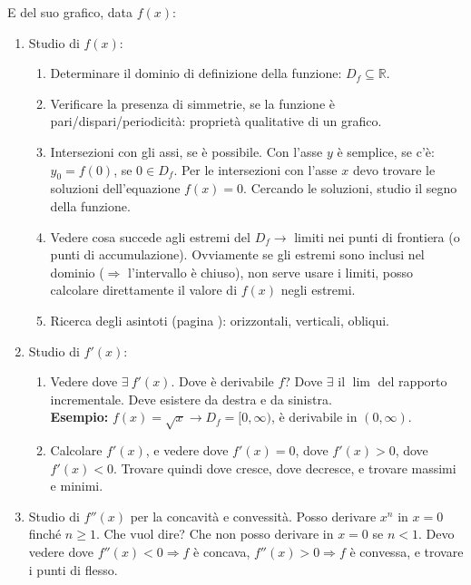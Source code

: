 \documentclass[12pt,a4paper]{article}
\begin{document}
E del suo grafico, data $f(x)$:
\begin{enumerate}
\item   Studio di $f(x)$:
    \begin{enumerate}
    \item   Determinare il dominio di definizione della funzione: 
            $D_f \subseteq \mathbb{R}$.
    \item   Verificare la presenza di simmetrie, se la funzione \`e 
            pari/dispari/periodicit\`a: propriet\`a qualitative di un grafico.
    \item   Intersezioni con gli assi, se \`e possibile. Con l'asse $y$ \`e
            semplice, se c'\`e: $y_0 = f(0)$, se $0 \in D_f$. Per le intersezioni
            con l'asse $x$ devo trovare le soluzioni dell'equazione $f(x) = 0$.
            Cercando le soluzioni, studio il segno della funzione.
    \item   Vedere cosa succede agli estremi del $D_f \to$ limiti nei punti di 
            frontiera (o punti di accumulazione). Ovviamente se gli estremi sono
            inclusi nel dominio ($\Rightarrow$ l'intervallo \`e chiuso), non
            serve usare i limiti, posso calcolare direttamente il valore
            di $f(x)$ negli estremi.
    \item   Ricerca degli asintoti (pagina \pageref{asintoti}): 
            orizzontali, verticali, obliqui.
    \end{enumerate}
\item   Studio di $f'(x)$:
    \begin{enumerate}
    \item   Vedere dove $\exists \ f'(x)$. Dove \`e derivabile $f$? Dove 
            $\exists$ il $\lim$ del rapporto incrementale. Deve esistere
            da destra e da sinistra. \\
            \textbf{Esempio:} $f(x) = \sqrt{x} \to D_f = [0,\infty)$, \`e
            derivabile in $(0,\infty)$.
    \item   Calcolare $f'(x)$, e vedere dove $f'(x) = 0$, dove $f'(x) > 0$,
            dove $f'(x) < 0$. Trovare quindi dove cresce, dove decresce, e
            trovare massimi e minimi.
    \end{enumerate}
\item   Studio di $f''(x)$ per la concavit\`a e convessit\`a. Posso derivare
        $ x^n$ in $x=0$ finch\'e $n \geq 1$. Che vuol dire? Che non posso 
        derivare in $x=0$ se $n <1$. Devo vedere dove $f''(x)<0 \Rightarrow
        f$ \`e concava, $f''(x) > 0 \Rightarrow f$ \`e convessa, e trovare
        i punti di flesso.
\end{enumerate}
\end{document}
